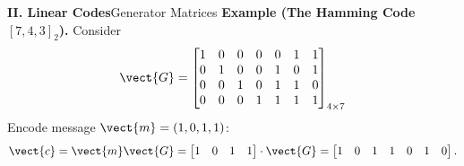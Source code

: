 
\begin{frame}{\textbf{II. Linear Codes}}{Generator Matrices}
\small
{}
\vfill
\textbf{Example (The Hamming Code $[7,4,3]_2$).}\; 
Consider \[
\vect{G} = \begin{bmatrix}
	1&0&0&0&0&1&1\\
	0&1&0&0&1&0&1\\
	0&0&1&0&1&1&0\\
	0&0&0&1&1&1&1
\end{bmatrix}_{4\times 7}
\] Encode message $\vect{m} = (1,0,1,1)$:
\[
\vect{c} = \vect{m}\vect{G} = \begin{bmatrix}
	1 & 0 & 1 & 1
\end{bmatrix}
\cdot \vect{G} = \begin{bmatrix}
	1 & 0 & 1 & 1 & 0 & 1 & 0
\end{bmatrix}.
\]

\end{frame}
